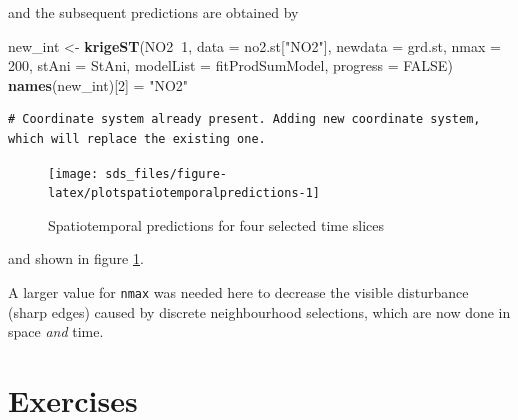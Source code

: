 \documentclass[]{book}
\newenvironment{Shaded}{\begin{snugshade}}{\end{snugshade}}
\newcommand{\DataTypeTok}[1]{\textcolor[rgb]{0.13,0.29,0.53}{#1}}
\newcommand{\DecValTok}[1]{\textcolor[rgb]{0.00,0.00,0.81}{#1}}
\newcommand{\KeywordTok}[1]{\textcolor[rgb]{0.13,0.29,0.53}{\textbf{#1}}}
\newcommand{\NormalTok}[1]{#1}
\newcommand{\OperatorTok}[1]{\textcolor[rgb]{0.81,0.36,0.00}{\textbf{#1}}}
\newcommand{\OtherTok}[1]{\textcolor[rgb]{0.56,0.35,0.01}{#1}}
\newcommand{\StringTok}[1]{\textcolor[rgb]{0.31,0.60,0.02}{#1}}
\begin{document}
and the subsequent predictions are obtained by

\begin{Shaded}
\begin{Highlighting}[]
\NormalTok{new_int <-}\StringTok{ }\KeywordTok{krigeST}\NormalTok{(NO2}\OperatorTok{~}\DecValTok{1}\NormalTok{, }\DataTypeTok{data =}\NormalTok{ no2.st[}\StringTok{"NO2"}\NormalTok{], }\DataTypeTok{newdata =}\NormalTok{ grd.st,}
         \DataTypeTok{nmax =} \DecValTok{200}\NormalTok{, }\DataTypeTok{stAni =}\NormalTok{ StAni, }\DataTypeTok{modelList =}\NormalTok{ fitProdSumModel,}
         \DataTypeTok{progress =} \OtherTok{FALSE}\NormalTok{)}
\KeywordTok{names}\NormalTok{(new_int)[}\DecValTok{2}\NormalTok{] =}\StringTok{ "NO2"}
\end{Highlighting}
\end{Shaded}

\begin{verbatim}
# Coordinate system already present. Adding new coordinate system, which will replace the existing one.
\end{verbatim}

\begin{figure}

{\centering \texttt{[image: sds\_files/figure-latex/plotspatiotemporalpredictions-1]} 

}

\caption{Spatiotemporal predictions for four selected time slices}\label{fig:plotspatiotemporalpredictions}
\end{figure}

and shown in figure \ref{fig:plotspatiotemporalpredictions}.

A larger value for \texttt{nmax} was needed here to decrease the visible
disturbance (sharp edges) caused by discrete neighbourhood
selections, which are now done in space \emph{and} time.

\hypertarget{exercises-11}{%
\section{Exercises}\label{exercises-11}}
\end{document}
